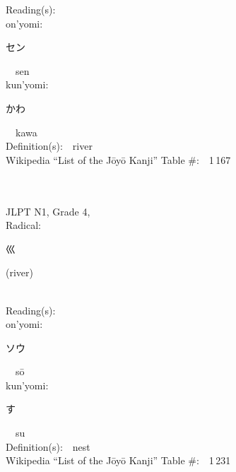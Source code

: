 \begin{multicols}{2}
Reading(s):\ \ \\
{\hspace*{1em}}on'yomi:\ \ \\
{\hspace*{2em}}{\begin{CJK}{UTF8}{min} セン \end{CJK}}\ \ sen\ \ \\
{\hspace*{1em}}kun'yomi:\ \ \\
{\hspace*{2em}}{\begin{CJK}{UTF8}{min} かわ \end{CJK}}\ \ kawa\ \ \\
Definition(s):\ \ river \\
Wikipedia ``List of the J\=oy\=o Kanji'' Table \#:\ \ 1\,167 \\
\ \ \\
{\fontsize{34pt}{40pt}  }\ \ \\  %
{JLPT N1, Grade 4, \\Radical:\ \ {\begin{CJK}{UTF8}{min} 巛 \end{CJK}} (river) } \\
Reading(s):\ \ \\
{\hspace*{1em}}on'yomi:\ \ \\
{\hspace*{2em}}{\begin{CJK}{UTF8}{min} ソウ \end{CJK}}\ \ s\=o\ \ \\
{\hspace*{1em}}kun'yomi:\ \ \\
{\hspace*{2em}}{\begin{CJK}{UTF8}{min} す \end{CJK}}\ \ su\ \ \\
Definition(s):\ \ nest \\
Wikipedia ``List of the J\=oy\=o Kanji'' Table \#:\ \ 1\,231 \\
\ \ \\
\end{multicols}



